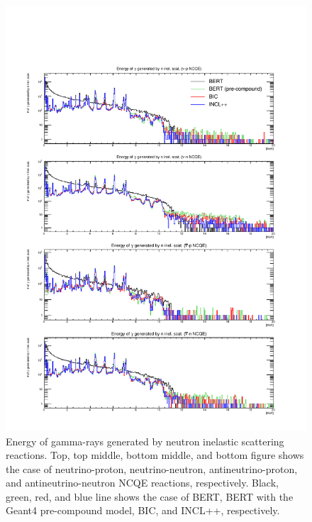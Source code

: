 \begin{figure}[h]
	\centering
	\includegraphics[width=16cm]{PDF/Secondary/Comparison_PreCompound/gamma/pdf1/Logy_EneSec}
	\caption[Energy of gamma-rays generated by neutron inelastic scattering reactions]{
	Energy of gamma-rays generated by neutron inelastic scattering reactions.
	Top, top middle, bottom middle, and bottom figure shows the case of neutrino-proton, neutrino-neutron, antineutrino-proton, and antineutrino-neutron NCQE reactions, respectively.
	Black, green, red, and blue line shows the case of BERT, BERT with the Geant4 pre-compound model, BIC, and INCL++, respectively.
	}\label{Others_gamma_Logy_EneSec}
\end{figure}

